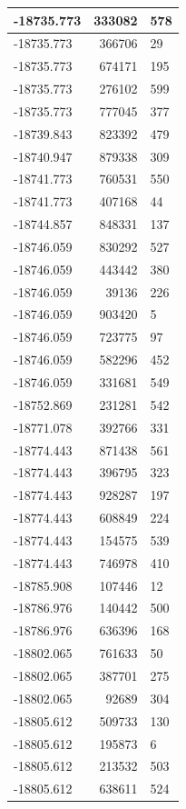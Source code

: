 \documentclass[]{book}
\theoremstyle{definition}
\theoremstyle{definition}
\theoremstyle{definition}
\theoremstyle{remark}
\begin{document}
\begin{tabular}{l|r|l}
\hline
-18735.773 & 333082 & 578\\
\hline
-18735.773 & 366706 & 29\\
\hline
-18735.773 & 674171 & 195\\
\hline
-18735.773 & 276102 & 599\\
\hline
-18735.773 & 777045 & 377\\
\hline
-18739.843 & 823392 & 479\\
\hline
-18740.947 & 879338 & 309\\
\hline
-18741.773 & 760531 & 550\\
\hline
-18741.773 & 407168 & 44\\
\hline
-18744.857 & 848331 & 137\\
\hline
-18746.059 & 830292 & 527\\
\hline
-18746.059 & 443442 & 380\\
\hline
-18746.059 & 39136 & 226\\
\hline
-18746.059 & 903420 & 5\\
\hline
-18746.059 & 723775 & 97\\
\hline
-18746.059 & 582296 & 452\\
\hline
-18746.059 & 331681 & 549\\
\hline
-18752.869 & 231281 & 542\\
\hline
-18771.078 & 392766 & 331\\
\hline
-18774.443 & 871438 & 561\\
\hline
-18774.443 & 396795 & 323\\
\hline
-18774.443 & 928287 & 197\\
\hline
-18774.443 & 608849 & 224\\
\hline
-18774.443 & 154575 & 539\\
\hline
-18774.443 & 746978 & 410\\
\hline
-18785.908 & 107446 & 12\\
\hline
-18786.976 & 140442 & 500\\
\hline
-18786.976 & 636396 & 168\\
\hline
-18802.065 & 761633 & 50\\
\hline
-18802.065 & 387701 & 275\\
\hline
-18802.065 & 92689 & 304\\
\hline
-18805.612 & 509733 & 130\\
\hline
-18805.612 & 195873 & 6\\
\hline
-18805.612 & 213532 & 503\\
\hline
-18805.612 & 638611 & 524\\

\end{tabular}
\end{document}
